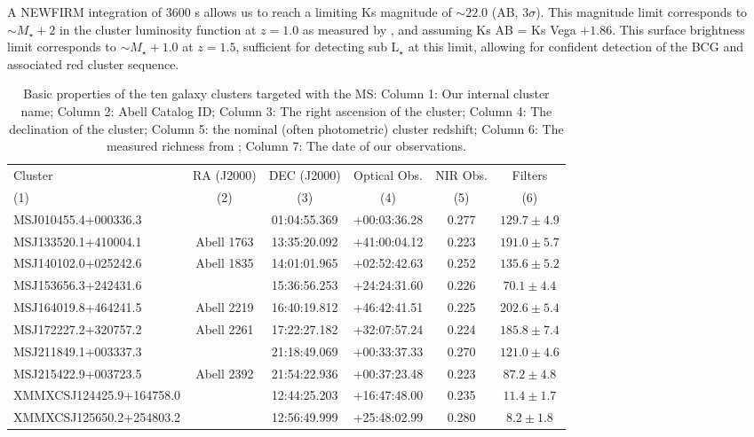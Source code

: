 \documentclass[apj, revtex4]{emulateapj}
\begin{document}
A NEWFIRM integration of 3600 s allows us to reach a limiting Ks magnitude of $\sim 22.0$ (AB, $3\sigma$). This magnitude limit corresponds to $\sim M_{\star} + 2$ in the cluster luminosity function at $z = 1.0$ as measured by \cite{DePropris1999a}, and assuming Ks AB = Ks Vega $+ 1.86$. This surface brightness limit corresponds to $\sim M_{\star} + 1.0$ at $z = 1.5$, sufficient for detecting sub L$_{\star}$ at this limit, allowing for confident detection of the BCG and associated red cluster sequence.

\begin{table*}
	\centering
	\caption[Basic properties of the ten galaxy clusters targeted with the MS.]{Basic properties of the ten galaxy clusters targeted with the MS: Column 1: Our internal cluster name; Column 2: Abell Catalog ID; Column 3: The right ascension of the cluster; Column 4: The declination of the cluster; Column 5: the nominal (often photometric) cluster redshift; Column 6: The measured richness from \cite{Rykoff2012}; Column 7: The date of our observations.} 
		\begin{tabular}{lccccc} 
			\hline 
			Cluster & RA (J2000) & DEC (J2000) & Optical Obs. & NIR Obs. & Filters\\
			(1) & (2) & (3) & (4) & (5) & (6) \\
			\hline \hline
			MSJ010455.4+000336.3 & \nd & 01:04:55.369 & +00:03:36.28 & 0.277 & $129.7\pm4.9$ \\
			MSJ133520.1+410004.1 & Abell 1763 & 13:35:20.092 & +41:00:04.12 & 0.223 & $191.0\pm5.7$ \\
			MSJ140102.0+025242.6 & Abell 1835 & 14:01:01.965 & +02:52:42.63 & 0.252 & $135.6\pm5.2$ \\
			MSJ153656.3+242431.6 & \nd & 15:36:56.253 & +24:24:31.60 & 0.226 & $70.1\pm4.4$ \\ 
			MSJ164019.8+464241.5 & Abell 2219 & 16:40:19.812 & +46:42:41.51 & 0.225 & $202.6\pm5.4$ \\
			MSJ172227.2+320757.2 & Abell 2261 & 17:22:27.182 & +32:07:57.24 & 0.224 & $185.8\pm7.4$ \\
			MSJ211849.1+003337.3 & \nd & 21:18:49.069 & +00:33:37.33 & 0.270 & $121.0\pm4.6$ \\
			MSJ215422.9+003723.5 & Abell 2392 & 21:54:22.936 & +00:37:23.48 & 0.223 & $87.2\pm4.8$ \\
			XMMXCSJ124425.9+164758.0 & \nd & 12:44:25.203 & +16:47:48.00 & 0.235 & $11.4\pm1.7$ \\
			XMMXCSJ125650.2+254803.2 & \nd & 12:56:49.999 & +25:48:02.99 & 0.280 & $8.2\pm1.8$ \\
			\hline 
		\end{tabular}
	\label{tbl:targets} 
\end{table*}
\end{document}
